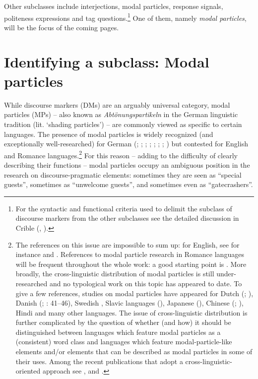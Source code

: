 Other subclasses include interjections, modal particles, response signals, politeness expressions and tag questions.\footnote{For the syntactic and functional criteria used to delimit the subclass of discourse markers from the other subclasses see the detailed discussion in Crible (\citeyear[105--109]{Crible2017}, \citeyear[34--37]{Crible2018}).} One of them, namely \textit{modal particles}, will be the focus of the coming pages.

\section{Identifying a subclass: Modal particles}
\hypertarget{Toc124860613}{}
While discourse markers (DMs) are an arguably universal category, modal particles (MPs) – also known as \textit{Abtönungspartikeln} in the German linguistic tradition (lit. ‘shading particles’) – are commonly viewed as specific to certain languages. The presence of modal particles is widely recognized (and exceptionally well-researched) for German (\citealt{Weydt1969,Weydt1979}; \citealt{Thurmair1989}; \citealt{Abraham1991}; \citealt{Meibauer1994}; \citealt{König1997}; \citealt{Waltereit2001,Waltereit2006}; \citealt{Zimmermann2011}; \citealt{BayerStruckmeier2017}) but contested for English and Romance languages.\footnote{The references on this issue are impossible to sum up: for English, see for instance \citet{Haselow2011} and \citet{FischerHeide2018}. References to modal particle research in Romance languages will be frequent throughout the whole work: a good starting point is \citet{Waltereit2001}. More broadly, the cross-linguistic distribution of modal particles is still under-researched and no typological work on this topic has appeared to date. To give a few references, studies on modal particles have appeared for Dutch (\citealt{Foolen1993}; \citealt{Vismans1994}), Danish (\citealt{Davidsen-Nielsen1996}; \citealt{Hansen1998a}: 41–46), Swedish \citep{Aijmer1996}, Slavic languages (\citealt{DedaićMišković-Luković2010}), Japanese (\citealt{IzutsuIzutsu2013}), Chinese (\citealt{Li2006}; \citealt{Fang2021}), Hindi \citep{Montaut2016} and many other languages. The issue of cross-linguistic distribution is further complicated by the question of whether (and how) it should be distinguished between languages which feature modal particles as a (consistent) word class and languages which feature modal-particle-like elements and/or elements that can be described as modal particles in some of their uses. Among the recent publications that adopt a cross-linguistic-oriented approach see \citet{ModicomDuplâtre2020}, \citet{GergelEtAl2022} and \citet{ArtiagoitiaEtAl2022}.} For this reason – adding to the difficulty of clearly describing their functions – modal particles occupy an ambiguous position in the research on discourse-pragmatic elements: sometimes they are seen as “special guests”, sometimes as “unwelcome guests”, and sometimes even as “gatecrashers”.

